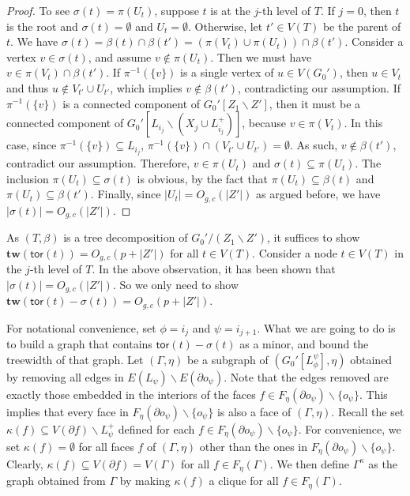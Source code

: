 \documentclass[a4paper,11pt]{article}
\numberwithin{lemma}{section}
\newcommand{\tw}{\mathbf{tw}}
\newcommand{\tor}{\mathsf{tor}}
\begin{document}
\begin{proof}
To see $\sigma(t) = \pi(U_t)$, suppose $t$ is at the $j$-th level of $T$.
If $j = 0$, then $t$ is the root and $\sigma(t) = \emptyset$ and $U_t = \emptyset$.
Otherwise, let $t' \in V(T)$ be the parent of $t$.
We have $\sigma(t) = \beta(t) \cap \beta(t') = (\pi(V_t) \cup \pi(U_t)) \cap \beta(t')$.
Consider a vertex $v \in \sigma(t)$, and assume $v \notin \pi(U_t)$.
Then we must have $v \in \pi(V_t) \cap \beta(t')$.
If $\pi^{-1}(\{v\})$ is a single vertex of $u \in V(G_0')$, then $u \in V_t$ and thus $u \notin V_{t'} \cup U_{t'}$, which implies $v \notin \beta(t')$, contradicting our assumption.
If $\pi^{-1}(\{v\})$ is a connected component of $G_0'[Z_1 \backslash Z']$, then it must be a connected component of $G_0'[L_{i_j} \backslash (X_j \cup L_{i_j}^+)]$, because $v \in \pi(V_t)$.
In this case, since $\pi^{-1}(\{v\}) \subseteq L_{i_j}$, $\pi^{-1}(\{v\}) \cap (V_{t'} \cup U_{t'}) = \emptyset$.
As such, $v \notin \beta(t')$, contradict our assumption.
Therefore, $v \in \pi(U_t)$ and $\sigma(t) \subseteq \pi(U_t)$.
The inclusion $\pi(U_t) \subseteq \sigma(t)$ is obvious, by the fact that $\pi(U_t) \subseteq \beta(t)$ and $\pi(U_t) \subseteq \beta(t')$.
Finally, since $|U_t| = O_{g,c}(|Z'|)$ as argued before, we have $|\sigma(t)| = O_{g,c}(|Z'|)$.
\end{proof}

As $(T,\beta)$ is a tree decomposition of $G_0'/(Z_1 \backslash Z')$, it suffices to show $\tw(\tor(t)) = O_{g,c}(p+|Z'|)$ for all $t \in V(T)$.
Consider a node $t \in V(T)$ in the $j$-th level of $T$.
In the above observation, it has been shown that $|\sigma(t)| = O_{g,c}(|Z'|)$.
So we only need to show $\tw(\tor(t) - \sigma(t)) = O_{g,c}(p+|Z'|)$.

For notational convenience, set $\phi = i_j$ and $\psi = i_{j+1}$.
What we are going to do is to build a graph that contains $\tor(t) - \sigma(t)$ as a minor, and bound the treewidth of that graph.
Let $(\varGamma,\eta)$ be a subgraph of $(G_0'[L_\phi^\psi],\eta)$ obtained by removing all edges in $E(L_\psi) \backslash E(\partial o_\psi)$.
Note that the edges removed are exactly those embedded in the interiors of the faces $f \in F_\eta(\partial o_{\psi}) \backslash \{o_{\psi}\}$.
This implies that every face in $F_\eta(\partial o_{\psi}) \backslash \{o_{\psi}\}$ is also a face of $(\varGamma,\eta)$.
Recall the set $\kappa(f) \subseteq V(\partial f) \backslash L_{\psi}^+$ defined for each $f \in F_\eta(\partial o_{\psi}) \backslash \{o_{\psi}\}$.
For convenience, we set $\kappa(f) = \emptyset$ for all faces $f$ of $(\varGamma,\eta)$ other than the ones in $F_\eta(\partial o_{\psi}) \backslash \{o_{\psi}\}$.
Clearly, $\kappa(f) \subseteq V(\partial f) = V(\varGamma)$ for all $f \in F_\eta(\varGamma)$.
We then define $\varGamma^\kappa$ as the graph obtained from $\varGamma$ by making $\kappa(f)$ a clique for all $f \in F_\eta(\varGamma)$.
\end{document}
